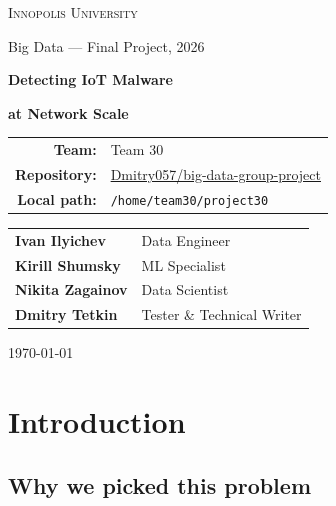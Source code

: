 \documentclass[11pt,a4paper]{article}
\begin{document}
\begin{titlepage}
    \centering
    \vspace*{2cm}
    {\large\textsc{Innopolis University}\par}
    \vspace{0.3cm}
    {\large Big Data --- Final Project, 2026\par}
    \vspace{4cm}

    {\Huge\bfseries Detecting IoT Malware\par}
    \vspace{0.4cm}
    {\Huge\bfseries at Network Scale\par}
    \vspace{0.6cm}
    \vspace{4cm}

    \begin{tabular}{rl}
        \textbf{Team:} & Team 30 \\
        \textbf{Repository:} & \href{https://github.com/Dmitry057/big-data-group-project}{Dmitry057/big-data-group-project} \\
        \textbf{Local path:} & \texttt{/home/team30/project30} \\
    \end{tabular}

    \vspace{2cm}

    \begin{tabular}{ll}
        \textbf{Ivan Ilyichev} & Data Engineer \\
        \textbf{Kirill Shumsky} & ML Specialist \\
        \textbf{Nikita Zagainov} & Data Scientist \\
        \textbf{Dmitry Tetkin} & Tester \& Technical Writer \\
    \end{tabular}

    \vfill
    \today
\end{titlepage}

\section{Introduction}

\subsection{Why we picked this problem}
\end{document}
